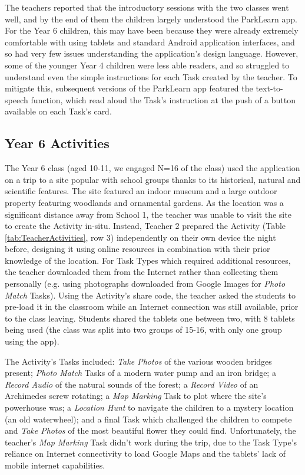 The teachers reported that the introductory sessions with the two classes went well, and by the end of them the children largely understood the ParkLearn app. For the Year 6 children, this may have been because they were already extremely comfortable with using tablets and standard Android application interfaces, and so had very few issues understanding the application’s design language. However, some of the younger Year 4 children were less able readers, and so struggled to understand even the simple instructions for each Task created by the teacher. To mitigate this, subsequent versions of the ParkLearn app featured the text-to-speech function, which read aloud the Task’s instruction at the push of a button available on each Task's card.

\subsection{Year 6 Activities}

The Year 6 class (aged 10-11, we engaged N=16 of the class) used the application on a trip to a site popular with school groups thanks to its historical, natural and scientific features. The site featured an indoor museum and a large outdoor property featuring woodlands and ornamental gardens. As the location was a significant distance away from School 1, the teacher was unable to visit the site to create the Activity in-situ. Instead, Teacher 2 prepared the Activity (Table \ref{tab:TeacherActivities}, row 3) independently on their own device the night before, designing it using online resources in combination with their prior knowledge of the location. For Task Types which required additional resources, the teacher downloaded them from the Internet rather than collecting them personally (e.g. using photographs downloaded from Google Images for \textit{Photo Match} Tasks). Using the Activity's share code, the teacher asked the students to pre-load it in the classroom while an Internet connection was still available, prior to the class leaving. Students shared the tablets one between two, with 8 tablets being used (the class was split into two groups of 15-16, with only one group using the app). 

The Activity's Tasks included: \textit{Take Photos} of the various wooden bridges present; \textit{Photo Match} Tasks of a modern water pump and an iron bridge; a \textit{Record Audio} of the natural sounds of the forest; a \textit{Record Video} of an Archimedes screw rotating; a \textit{Map Marking} Task to plot where the site's powerhouse was; a \textit{Location Hunt} to navigate the children to a mystery location (an old waterwheel); and a final Task which challenged the children to compete and \textit{Take Photos} of the most beautiful flower they could find. Unfortunately, the teacher's \textit{Map Marking} Task didn't work during the trip, due to the Task Type's reliance on Internet connectivity to load Google Maps and the tablets' lack of mobile internet capabilities.

